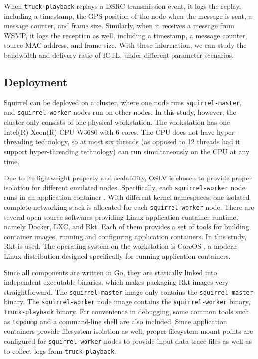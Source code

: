 \documentclass[12pt]{report}
\begin{document}
When \texttt{truck-playback} replays a DSRC transmission event, it logs the replay, including a timestamp, the GPS position of the node when the message is sent, a message counter, and frame size. Similarly, when it receives a message from WSMP, it logs the reception as well, including a timestamp, a message counter, source MAC address, and frame size. With these information, we can study the bandwidth and delivery ratio of ICTL, under different parameter scenarios.

\subsection{Deployment}

Squirrel can be deployed on a cluster, where one node runs \texttt{squirrel-master}, and \texttt{squirrel-worker} nodes run on other nodes. In this study, however, the cluster only consists of one physical workstation. The workstation has one Intel(R) Xeon(R) CPU W3680 with 6 cores. The CPU does not have hyper-threading technology, so at most six threads (as opposed to 12 threads had it support hyper-threading technology) can run simultaneously on the CPU at any time.

Due to its lightweight property and scalability, OSLV is chosen to provide proper isolation for different emulated nodes. Specifically, each \texttt{squirrel-worker} node runs in an application container \cite{menage2007adding}. With different kernel namespaces, one isolated complete networking stack is allocated for each \texttt{squirrel-worker} node. There are several open source softwares providing Linux application container runtime, namely Docker, LXC, and Rkt. Each of them provides a set of tools for building container images, running and configuring application containers. In this study, Rkt \cite{rkt} is used. The operating system on the workstation is CoreOS \cite{coreos}, a modern Linux distribution designed specifically for running application containers.

Since all components are written in Go, they are statically linked into independent executable binaries, which makes packaging Rkt images very straightforward. The \texttt{squirrel-master} image only contains the \texttt{squirrel-master} binary. The \texttt{squirrel-worker} node image contains the \texttt{squirrel-worker} binary, \texttt{truck-playback} binary. For convenience in debugging, some common tools such as \texttt{tcpdump} and a command-line shell are also included. Since application containers provide filesystem isolation as well, proper filesystem mount points are configured for \texttt{squirrel-worker} nodes to provide input data trace files as well as to collect logs from \texttt{truck-playback}.
\end{document}

